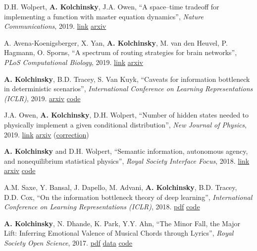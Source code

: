D.H. Wolpert, \textbf{A. Kolchinsky}, J.A. Owen, ``A space–time tradeoff for implementing a function with master equation dynamics'', \emph{Nature Communications}, 2019. 
\href{https://rdcu.be/bwX2T}{link}
\href{https://arxiv.org/abs/1708.08494}{arxiv} 

A. Avena-Koenigsberger, X. Yan, \textbf{A. Kolchinsky}, M. van den Heuvel, P. Hagmann, O. Sporns, 
``A spectrum of routing strategies for brain networks'', \emph{PLoS Computational Biology}, 2019. 
\href{https://doi.org/10.1371/journal.pcbi.1006833}{link}
\href{https://arxiv.org/abs/1803.08541}{arxiv} 

\textbf{A. Kolchinsky}, B.D. Tracey, S. Van Kuyk, ``Caveats for information bottleneck in deterministic scenarios'', \emph{International Conference on Learning Representations (ICLR)}, 2019. 
\href{https://arxiv.org/abs/1808.07593}{arxiv} 
\href{https://github.com/artemyk/ibcurve}{code}


J.A. Owen, \textbf{A. Kolchinsky}, D.H. Wolpert, ``Number of hidden states needed to physically implement a given conditional distribution'', \emph{New Journal of Physics}, 2019. 
\href{https://doi.org/10.1088/1367-2630/aaf81d}{link}
\href{https://arxiv.org/abs/1709.00765}{arxiv} (\href{https://iopscience.iop.org/article/10.1088/1367-2630/ab60f8}{correction})


\textbf{A. Kolchinsky} and D.H. Wolpert, 
``Semantic information, autonomous agency, and nonequilibrium statistical physics'', 
\emph{Royal Society Interface Focus}, 2018.
\href{http://rsfs.royalsocietypublishing.org/content/8/6/20180041}{link} 
\href{https://arxiv.org/abs/1806.08053}{arxiv} 
\href{https://github.com/artemyk/semantic_information/}{code}

A.M. Saxe, Y. Bansal, J. Dapello, M. Advani, \textbf{A. Kolchinsky}, B.D. Tracey, D.D. Cox, 
``On the information bottleneck theory of deep learning'',  \emph{International Conference on Learning Representations (ICLR)}, 2018. 
\href{https://www.researchgate.net/profile/Joel_Dapello/publication/325022755_Published_as_a_conference_paper_at_ICLR_2018_ON_THE_INFORMATION_BOTTLENECK_THEORY_OF_DEEP_LEARNING/links/5af1ff5d0f7e9ba36645dc31/Published-as-a-conference-paper-at-ICLR-2018-ON-THE-INFORMATION-BOTTLENECK-THEORY-OF-DEEP-LEARNING.pdf}{pdf} 
\href{https://github.com/artemyk/ibsgd/tree/iclr2018}{code}

\textbf{A. Kolchinsky}, N. Dhande, K. Park, Y.Y. Ahn, ``The Minor Fall, the Major Lift: Inferring Emotional Valence of Musical Chords through Lyrics'', \emph{Royal Society Open Science}, 2017. 
\href{http://rsos.royalsocietypublishing.org/content/4/11/170952.full.pdf}{pdf} 
\href{https://doi.org/10.6084/m9.figshare.5413060.v1.}{data} 
\href{https://github.com/artemyk/chordsentiment}{code}

